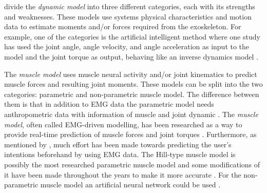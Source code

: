 \citeauthor{Anam2012} divide the \textit{dynamic model} into three different categories, each with its strengths and weaknesses.
These models use systems physical characteristics and motion data to estimate moments and/or forces required from the exoskeleton. 
For example, one of the categories is the artificial intelligent method where one study has used the joint angle, angle velocity, and angle acceleration as input to the model and the joint torque as output, behaving like an inverse dynamics model \cite{Anam2012}.

The \textit{muscle model} uses muscle neural activity and/or joint kinematics to predict muscle forces and resulting joint moments. These models can be split into the two categories: parametric and non-parametric muscle model. 
The difference between them is that in addition to \ac{EMG} data the parametric model needs anthropometric data with information of muscle and joint dynamic \cite{Anam2012}.
The \textit{muscle model}, often called \ac{EMG}-driven modelling, has been researched as a way to provide real-time prediction of muscle forces and joint torques \cite{Anam2012, durandau, Pizzolato2015}. 
Furthermore, as mentioned by , much effort has been made towards predicting the user's intentions beforehand by using \ac{EMG} data.
The Hill-type muscle model is possibly the most researched parametric muscle model and some modifications of it have been made throughout the years to make it more accurate \cite{Lloyd2003, Anam2012, Pizzolato2015, Lee14-1}.
For the non-parametric muscle model an artificial neural network could be used \cite{Kiguchi2012,Lee14-1}.  





